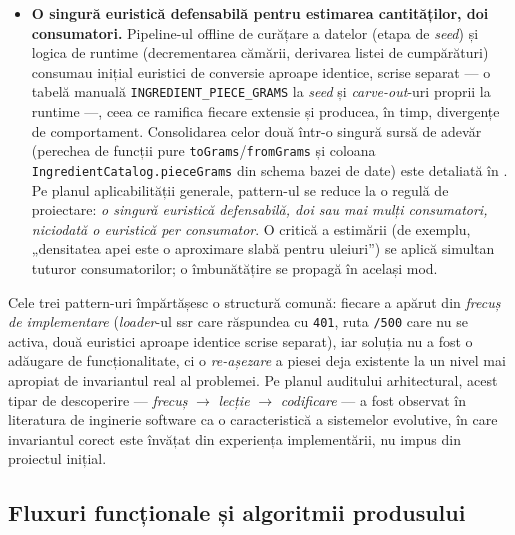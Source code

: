 \begin{itemize}
  \item \textbf{O singură euristică defensabilă pentru estimarea cantităților, doi consumatori.} Pipeline-ul offline de curățare a datelor (etapa de \textit{seed}) și logica de runtime (decrementarea cămării, derivarea listei de cumpărături) consumau inițial euristici de conversie aproape identice, scrise separat --- o tabelă manuală \texttt{INGREDIENT\_PIECE\_GRAMS} la \textit{seed} și \textit{carve-out}-uri proprii la runtime ---, ceea ce ramifica fiecare extensie și producea, în timp, divergențe de comportament. Consolidarea celor două într-o singură sursă de adevăr (perechea de funcții pure \texttt{toGrams}/\texttt{fromGrams} și coloana \texttt{IngredientCatalog.pieceGrams} din schema bazei de date) este detaliată în . Pe planul aplicabilității generale, pattern-ul se reduce la o regulă de proiectare: \textit{o singură euristică defensabilă, doi sau mai mulți consumatori, niciodată o euristică per consumator}. O critică a estimării (de exemplu, „densitatea apei este o aproximare slabă pentru uleiuri”) se aplică simultan tuturor consumatorilor; o îmbunătățire se propagă în același mod.
\end{itemize}

Cele trei pattern-uri împărtășesc o structură comună: fiecare a apărut din \textit{frecuș de implementare} (\textit{loader}-ul \acrshort{ssr} care răspundea cu \texttt{401}, ruta \texttt{/500} care nu se activa, două euristici aproape identice scrise separat), iar soluția nu a fost o adăugare de funcționalitate, ci o \textit{re-așezare} a piesei deja existente la un nivel mai apropiat de invariantul real al problemei. Pe planul auditului arhitectural, acest tipar de descoperire --- \textit{frecuș} \(\rightarrow\) \textit{lecție} \(\rightarrow\) \textit{codificare} --- a fost observat în literatura de inginerie software ca o caracteristică a sistemelor evolutive, în care invariantul corect este învățat din experiența implementării, nu impus din proiectul inițial.

\subsection{Fluxuri funcționale și algoritmii produsului}\label{subsec:fluxuri-functionale}

